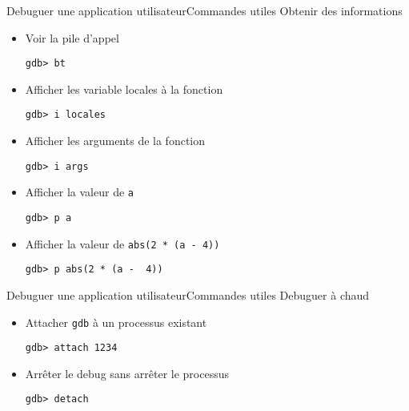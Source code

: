 \begin{frame}[fragile=singleslide]{Debuguer une application utilisateur}{Commandes utiles}
  Obtenir des informations
  \begin{itemize}
  \item Voir la pile d'appel
    \begin{lstlisting}
gdb> bt
    \end{lstlisting}
  \item Afficher les variable locales à la fonction
    \begin{lstlisting}
gdb> i locales
    \end{lstlisting}
  \item Afficher les arguments de la fonction
    \begin{lstlisting}
gdb> i args
    \end{lstlisting}
  \item Afficher la valeur de \verb+a+
    \begin{lstlisting}
gdb> p a
    \end{lstlisting}
  \item Afficher la valeur de \verb+abs(2 * (a - 4))+
    \begin{lstlisting}
gdb> p abs(2 * (a -  4))
    \end{lstlisting}
  \end{itemize}
\end{frame}

\begin{frame}[fragile=singleslide]{Debuguer une application utilisateur}{Commandes utiles}
  Debuguer à chaud
  \begin{itemize}
  \item Attacher \verb+gdb+ à un processus existant
    \begin{lstlisting}
gdb> attach 1234
    \end{lstlisting}
  \item Arrêter le debug sans arrêter le processus
    \begin{lstlisting}
gdb> detach
     \end{lstlisting}
   \end{itemize}
\end{frame}


